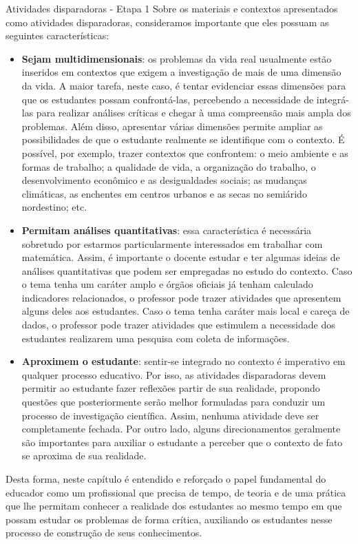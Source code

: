 \begin{paginatexto}{Atividades disparadoras - Etapa 1}
Sobre os materiais e contextos apresentados como atividades disparadoras, consideramos importante que eles possuam as seguintes características:

\begin{itemize}
\item \textbf{Sejam multidimensionais}: os problemas da vida real usualmente estão inseridos em contextos que exigem a investigação de mais de uma dimensão da vida. A maior tarefa, neste caso, é tentar evidenciar essas dimensões para que os estudantes possam confrontá-las, percebendo a necessidade de integrá-las para realizar análises críticas e chegar à uma compreensão mais ampla dos problemas. Além disso, apresentar várias dimensões permite ampliar as possibilidades de que o estudante realmente se identifique com o contexto. É possível, por exemplo, trazer contextos que confrontem: o meio ambiente e as formas de trabalho; a qualidade de vida, a organização do trabalho, o desenvolvimento econômico e as desigualdades sociais; as mudanças climáticas, as enchentes em centros urbanos e as secas no semiárido nordestino;   etc.
\item \textbf{Permitam análises quantitativas}: essa característica é necessária sobretudo por estarmos particularmente interessados em trabalhar com matemática. Assim, é importante o docente estudar e ter algumas ideias de análises quantitativas que podem ser empregadas no estudo do contexto. Caso o tema tenha um caráter amplo e órgãos oficiais já tenham calculado indicadores relacionados, o professor pode trazer atividades que apresentem alguns deles aos estudantes. Caso o tema tenha caráter mais local e careça de dados, o professor pode trazer atividades que estimulem a necessidade dos estudantes realizarem uma pesquisa com coleta de informações.
\item \textbf{Aproximem o estudante}: sentir-se integrado no contexto é imperativo em qualquer processo educativo. Por isso, as atividades disparadoras devem permitir ao estudante fazer reflexões partir de sua realidade, propondo questões que posteriormente serão melhor formuladas para conduzir um processo de investigação científica. Assim, nenhuma atividade deve ser completamente fechada. Por outro lado, alguns direcionamentos geralmente são importantes para auxiliar o estudante a perceber que o contexto de fato se aproxima de sua realidade.
\end{itemize}

Desta forma, neste capítulo é entendido e reforçado o papel fundamental do educador como um profissional que precisa de tempo, de teoria e de uma prática que lhe permitam conhecer a realidade dos estudantes ao mesmo tempo em que possam estudar os problemas de forma crítica, auxiliando os estudantes nesse processo de construção de seus conhecimentos.

\end{paginatexto}

